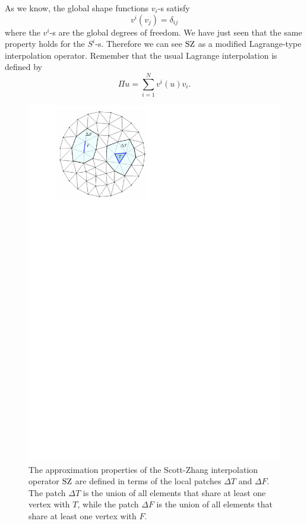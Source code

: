 \begin{remark}
    As we know, the global shape functions $v_i$-s satisfy
    \[
    v^i(v_j) = \delta_{ij}
    \]
    where the $v^i$-s are the global degrees of freedom. We have just seen that the same property holds for the $S^i$-s. Therefore we can see $\operatorname{SZ}$ as a modified Lagrange-type interpolation operator. Remember that the usual Lagrange interpolation is defined by
    \[
    \Pi u = \sum_{i=1}^N v^i(u) v_i.
    \]
\end{remark}

\begin{figure}
    \centering
    \includegraphics{figures/scott_zhang_patches.pdf}
    \caption{The approximation properties of the Scott-Zhang interpolation operator $\operatorname{SZ}$ are defined in terms of the local patches $\Delta T$ and $\Delta F$. The patch $\Delta T$ is the union of all elements that share at least one vertex with $T$, while the patch $\Delta F$ is the union of all elements that share at least one vertex with $F$.}
    \label{fig:scott_zhang_patches}
\end{figure}

